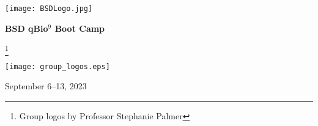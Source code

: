 \documentclass{article}
\newcommand\blfootnote[1]{%
  \begingroup
  \renewcommand\thefootnote{}\footnote{#1}%
  \addtocounter{footnote}{-1}%
  \endgroup
}
\begin{document}
\begin{centering}
\texttt{[image: BSDLogo.jpg]}

\vspace{0.11in}

\Huge{\textbf{BSD qBio$^9$ Boot Camp}}

\blfootnote{Group logos by Professor Stephanie Palmer}

\vspace{0.1in}

\texttt{[image: group\_logos.eps]}



\vspace{0.2in}

\Large{September 6--13, 2023}\\

\end{centering}
\end{document}
